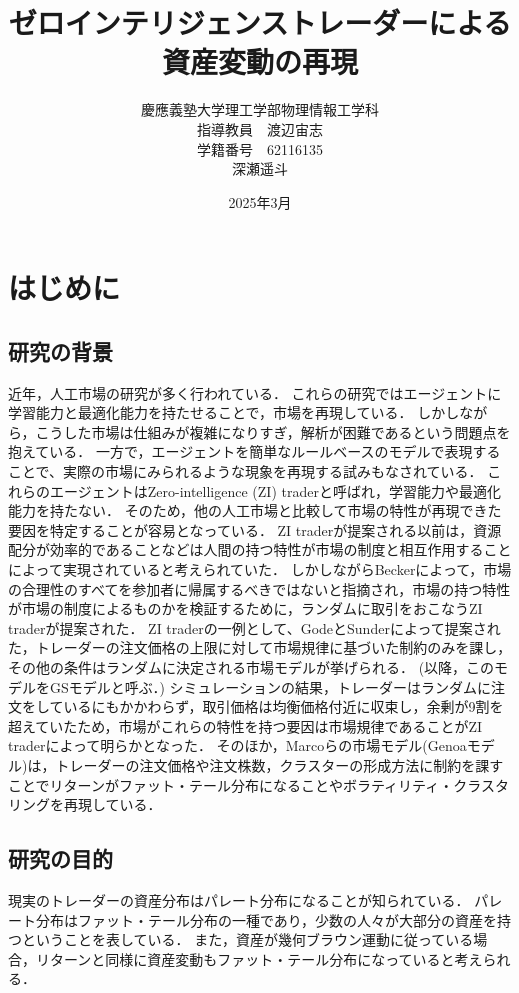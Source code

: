 \documentclass[titlepage]{jsreport}
\title{ゼロインテリジェンストレーダーによる資産変動の再現}
\author{慶應義塾大学理工学部物理情報工学科\\
指導教員　渡辺宙志\\
学籍番号　62116135\\
深瀬遥斗}
\date{2025年3月}
\begin{document}
\maketitle
\setcounter{tocdepth}{2}
\tableofcontents

\chapter{はじめに} \label{chap:introduction}

\section{研究の背景}
近年，人工市場の研究が多く行われている\cite{artificial_market1,artificial_market2,artificial_market3,artificial_market4}．
これらの研究ではエージェントに学習能力と最適化能力を持たせることで，市場を再現している．
しかしながら，こうした市場は仕組みが複雑になりすぎ，解析が困難であるという問題点を抱えている\cite{Genoa}．
一方で，エージェントを簡単なルールベースのモデルで表現することで、実際の市場にみられるような現象を再現する試みもなされている\cite{zit1,zit2}．
これらのエージェントはZero-intelligence (ZI) traderと呼ばれ，学習能力や最適化能力を持たない．
そのため，他の人工市場と比較して市場の特性が再現できた要因を特定することが容易となっている．
ZI traderが提案される以前は，資源配分が効率的であることなどは人間の持つ特性が市場の制度と相互作用することによって実現されていると考えられていた\cite{Gode_and_Sunder_code}．
しかしながらBeckerによって，市場の合理性のすべてを参加者に帰属するべきではないと指摘され，市場の持つ特性が市場の制度によるものかを検証するために，ランダムに取引をおこなうZI traderが提案された\cite{market_displine}．
ZI traderの一例として、GodeとSunderによって提案された，トレーダーの注文価格の上限に対して市場規律に基づいた制約のみを課し，その他の条件はランダムに決定される市場モデルが挙げられる\cite{Gode_and_Sunder}．
(以降，このモデルをGSモデルと呼ぶ．)
シミュレーションの結果，トレーダーはランダムに注文をしているにもかかわらず，取引価格は均衡価格付近に収束し，余剰が9割を超えていたため，市場がこれらの特性を持つ要因は市場規律であることがZI traderによって明らかとなった．
そのほか，Marcoらの市場モデル(Genoaモデル)は，トレーダーの注文価格や注文株数，クラスターの形成方法に制約を課すことでリターンがファット・テール分布になることやボラティリティ・クラスタリングを再現している\cite{Genoa}．

\section{研究の目的}
現実のトレーダーの資産分布はパレート分布になることが知られている\cite{Pareto}．
パレート分布はファット・テール分布の一種であり，少数の人々が大部分の資産を持つということを表している\cite{Pareto_fat-tailed}．
また，資産が幾何ブラウン運動に従っている場合，リターンと同様に資産変動もファット・テール分布になっていると考えられる．
\end{document}
